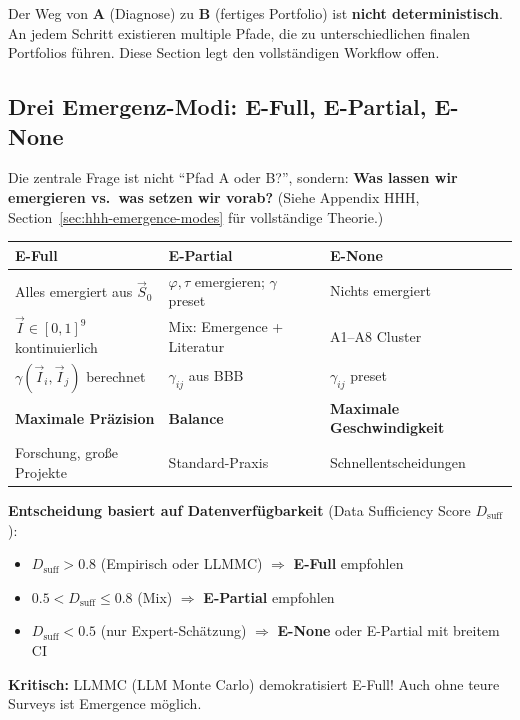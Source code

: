 Der Weg von \textbf{A} (Diagnose) zu \textbf{B} (fertiges Portfolio) ist \textbf{nicht deterministisch}. An jedem Schritt existieren multiple Pfade, die zu unterschiedlichen finalen Portfolios führen. Diese Section legt den vollständigen Workflow offen.

\subsection{Drei Emergenz-Modi: E-Full, E-Partial, E-None}
\label{sec:20-workflow-paths}

\begin{tcolorbox}[colback=red!5!white, colframe=red!75!black,
    title=\textbf{Fundamentale Entscheidung: Welcher Emergenz-Modus?}]

Die zentrale Frage ist nicht ``Pfad A oder B?'', sondern: \textbf{Was lassen wir emergieren vs.\ was setzen wir vorab?} (Siehe Appendix HHH, Section~\ref{sec:hhh-emergence-modes} für vollständige Theorie.)

\begin{center}
\renewcommand{\arraystretch}{1.4}
\begin{tabular}{@{}p{3.5cm}p{4cm}p{4cm}@{}}
\toprule
\textbf{E-Full} & \textbf{E-Partial} & \textbf{E-None} \\
\midrule
Alles emergiert aus $\vec{S}_0$ & $\varphi, \tau$ emergieren; $\gamma$ preset & Nichts emergiert \\
$\vec{I} \in [0,1]^9$ kontinuierlich & Mix: Emergence + Literatur & A1--A8 Cluster \\
$\gamma(\vec{I}_i, \vec{I}_j)$ berechnet & $\gamma_{ij}$ aus BBB & $\gamma_{ij}$ preset \\
\textbf{Maximale Präzision} & \textbf{Balance} & \textbf{Maximale Geschwindigkeit} \\
Forschung, große Projekte & Standard-Praxis & Schnellentscheidungen \\
\bottomrule
\end{tabular}
\end{center}

\textbf{Entscheidung basiert auf Datenverfügbarkeit} (Data Sufficiency Score $D_{\text{suff}}$):
\begin{itemize}[nosep]
\item $D_{\text{suff}} > 0.8$ (Empirisch oder LLMMC) $\Rightarrow$ \textbf{E-Full} empfohlen
\item $0.5 < D_{\text{suff}} \leq 0.8$ (Mix) $\Rightarrow$ \textbf{E-Partial} empfohlen
\item $D_{\text{suff}} < 0.5$ (nur Expert-Schätzung) $\Rightarrow$ \textbf{E-None} oder E-Partial mit breitem CI
\end{itemize}

\textbf{Kritisch:} LLMMC (LLM Monte Carlo) demokratisiert E-Full! Auch ohne teure Surveys ist Emergence möglich.
\end{tcolorbox}

